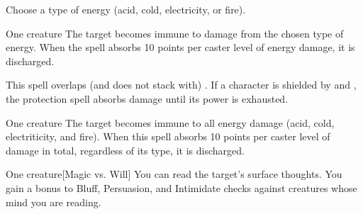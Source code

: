\begin{spellheader}
    \spellspecial Choose a type of energy (acid, cold, electricity, or fire).
\end{spellheader}
\begin{spelleffects}
    \begin{spelltarget}{One creature}
        \spelleffect The target becomes immune to damage from the chosen type of energy. When the spell absorbs 10 points per caster level of energy damage, it is discharged.
    \end{spelltarget}
\end{spelleffects}
\begin{spellfooter}
    \spellnotes This spell overlaps (and does not stack with) . If a character is shielded by  and , the protection spell absorbs damage until its power is exhausted.
\end{spellfooter}

\begin{spellheader}
\end{spellheader}
\begin{spelleffects}
    \begin{spelltarget}{One creature}
        \spelleffect The target becomes immune to all energy damage (acid, cold, electriticity, and fire). When this spell absorbs 10 points per caster level of damage in total, regardless of its type, it is discharged.
    \end{spelltarget}
\end{spelleffects}

\begin{comment}
\subsubsection{Q-R}
\end{comment}

\begin{spellheader}
    \spellrng{\rngmed}
\end{spellheader}
\begin{spelleffects}
    \begin{spelltarget}{One creature}[Magic vs. Will]
        \spellsuccess You can read the target's surface thoughts. You gain a  bonus to Bluff, Persuasion, and Intimidate checks against creatures whose mind you are reading.
    \end{spelltarget}
\end{spelleffects}

